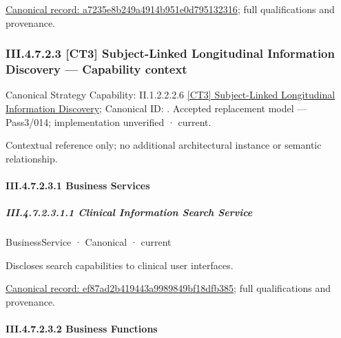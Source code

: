 {\footnotesize \href{../../../../continuum/business/business-function/a7235e8b249a4914b951e0d795132316.md}{Canonical record: a7235e8b249a4914b951e0d795132316}; full qualifications and provenance.}\par
\subsubsection*{III.4.7.2.3 [CT3] Subject-Linked Longitudinal Information Discovery — Capability context}
\label{navigation:III.4.7.2.3}

{\small Canonical Strategy Capability: II.1.2.2.2.6 \hyperref[element:645372b4e7eb431d916ff3254f11689b]{[CT3] Subject-Linked Longitudinal Information Discovery}; Canonical ID: \texttt{}. Accepted replacement model — Pass3/014; implementation unverified · current.}\par
Contextual reference only; no additional architectural instance or semantic relationship.\par
\paragraph*{III.4.7.2.3.1 Business Services}
\label{navigation:III.4.7.2.3.1}

\subparagraph*{III.4.7.2.3.1.1 Clinical Information Search Service}
\label{navigation:III.4.7.2.3.1.1}

\label{element:ef87ad2b419443a9989849bf18dfb385}
{\small BusinessService · Canonical · current}\par

Discloses search capabilities to clinical user interfaces.


{\footnotesize \href{../../../../continuum/business/business-service/ef87ad2b419443a9989849bf18dfb385.md}{Canonical record: ef87ad2b419443a9989849bf18dfb385}; full qualifications and provenance.}\par
\paragraph*{III.4.7.2.3.2 Business Functions}
\label{navigation:III.4.7.2.3.2}

